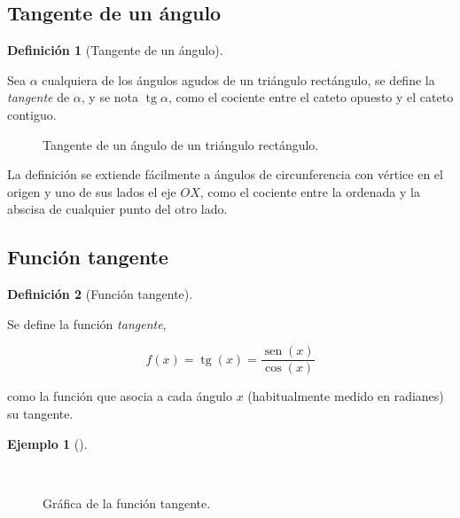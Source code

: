 \documentclass[
  a4paper,
]{scrreport}
\theoremstyle{plain}
\theoremstyle{plain}
\theoremstyle{definition}
\newtheorem{definition}{Definición}[chapter]
\theoremstyle{plain}
\theoremstyle{definition}
\newtheorem{example}{Ejemplo}[chapter]
\theoremstyle{remark}
\begin{document}
\hypertarget{tangente-de-un-uxe1ngulo}{%
\subsection{Tangente de un ángulo}\label{tangente-de-un-uxe1ngulo}}

\leavevmode{}%
\begin{definition}[Tangente de un ángulo]\label{def-tangente-angulo}

Sea \(\alpha\) cualquiera de los ángulos agudos de un triángulo
rectángulo, se define la \emph{tangente} de \(\alpha\), y se nota
\(\operatorname{tg} \alpha\), como el cociente entre el cateto opuesto y
el cateto contiguo.

\end{definition}

\begin{figure}

{\centering 



}

\caption{Tangente de un ángulo de un triángulo rectángulo.}

\end{figure}

La definición se extiende fácilmente a ángulos de circunferencia con
vértice en el origen y uno de sus lados el eje \(OX\), como el cociente
entre la ordenada y la abscisa de cualquier punto del otro lado.

\hypertarget{funciuxf3n-tangente}{%
\subsection{Función tangente}\label{funciuxf3n-tangente}}

\leavevmode{}%
\begin{definition}[Función tangente]\label{def-funcion-tangente}

Se define la función \emph{tangente},

\[f(x)=\operatorname{tg}(x)=\frac{\operatorname{sen}(x)}{\cos(x)}\]

como la función que asocia a cada ángulo \(x\) (habitualmente medido en
radianes) su tangente.

\end{definition}

\leavevmode{}%
\begin{example}[]\label{exm-funcion-tangente}

~

\begin{figure}

{\centering 



}

\caption{Gráfica de la función tangente.}

\end{figure}

\end{example}
\end{document}
